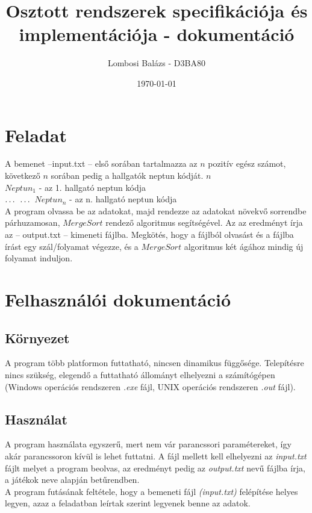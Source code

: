 \documentclass{article}
\title{Osztott rendszerek specifikációja és implementációja - dokumentáció}
\author{Lombosi Balázs - D3BA80}
\date{\today}
\begin{document}
\maketitle

\tableofcontents
\newpage

\section{Feladat}

A bemenet --input.txt -- első sorában tartalmazza az $n$ pozitív egész számot, következő $n$ sorában pedig a hallgatók neptun kódját.
$n$\\
$Neptun_{1}$ - az 1. hallgató neptun kódja \\
$\dots\\ $
$\dots\\ $
$Neptun_{n}$ - az n. hallgató neptun kódja \\

A program olvassa be az adatokat, majd rendezze az adatokat növekvő sorrendbe párhuzamosan, $MergeSort$ rendező algoritmus segítségével.
Az az eredményt írja az -- output.txt -- kimeneti fájlba.
Megkötés, hogy a fájlból olvasást és a fájlba írást egy szál/folyamat végezze, és a $MergeSort$ algoritmus két ágához mindig új folyamat induljon.
\newpage

\section{Felhasználói dokumentáció}

\subsection{Környezet}
A program több platformon futtatható, nincsen dinamikus függősége. Telepítésre nincs szükség, elegendő a futtatható állományt elhelyezni a számítógépen \\
(Windows operációs rendszeren \textit{.exe} fájl, UNIX operációs rendszeren \textit{.out} fájl).

\subsection{Használat}
A program használata egyszerű, mert nem vár parancssori paramétereket, így akár parancssoron kívül is lehet futtatni. A fájl mellett kell elhelyezni az \textit{input.txt} fájlt melyet a program beolvas, az eredményt pedig az \textit{output.txt} nevű fájlba írja, a játékok neve alapján betűrendben.\\
A program futásának feltétele, hogy a bemeneti fájl \textit{(input.txt)} felépítése helyes legyen, azaz a feladatban leírtak szerint legyenek benne az adatok.
\newpage
\end{document}
